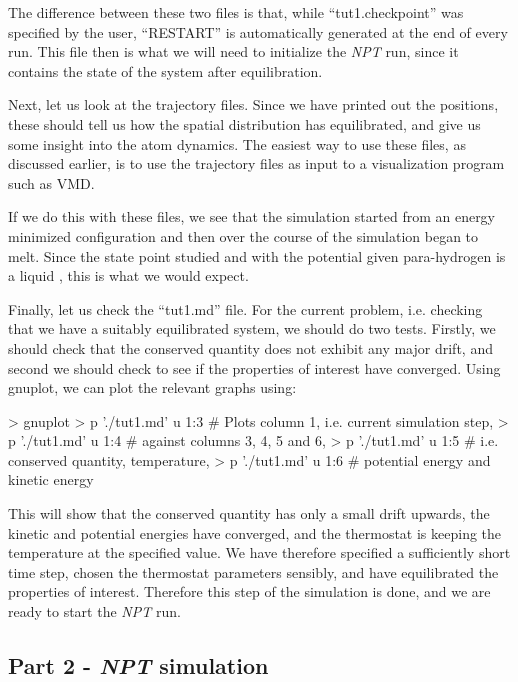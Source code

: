 \documentclass[11pt,english,fleqn]{report}
\newenvironment{code}{%
\footnotesize 
\verbatim
}{
\endverbatim
\normalsize
}
\begin{document}
The difference between these two files is that, while {}``tut1.checkpoint''
was specified by the user, {}``RESTART'' is automatically generated at the
end of every \ipi run. This file then is what we will need to initialize the
\emph{NPT} run, since it contains the state of the system after
equilibration.

Next, let us look at the trajectory files. Since we have printed out
the positions, these should tell us how the spatial distribution
has equilibrated, and give us some insight into the atom dynamics.
The easiest way to use these files, as discussed earlier, is to
use the trajectory files as input to a visualization program such as VMD.

If we do this with these files, we see that the simulation started
from an energy minimized configuration and then over the course
of the simulation began to melt. Since the state point studied
and with the potential given para-hydrogen is a liquid \cite{silv-gold78jcp},
this is what we would expect.

Finally, let us check the {}``tut1.md'' file. For the current
problem, i.e. checking that we have a suitably equilibrated system,
we should do two tests. Firstly,
we should check that the conserved quantity does not exhibit any major
drift, and second we should check to see if the properties of interest
have converged. Using gnuplot, we can plot the relevant graphs using:

\begin{code}
> gnuplot
> p './tut1.md' u 1:3 # Plots column 1, i.e. current simulation step, 
> p './tut1.md' u 1:4 # against columns 3, 4, 5 and 6,
> p './tut1.md' u 1:5 # i.e. conserved quantity, temperature,
> p './tut1.md' u 1:6 # potential energy and kinetic energy
\end{code}

This will show that the conserved quantity has only a small drift upwards,
the kinetic and potential energies have converged, and the thermostat
is keeping the temperature at the specified value.
We have therefore specified a sufficiently short time step, chosen the
thermostat parameters sensibly, and have equilibrated the properties
of interest.
Therefore this step of the simulation is done, and we are ready
to start the \emph{NPT} run.

\subsection{Part 2 - \emph{NPT} simulation}
\end{document}

